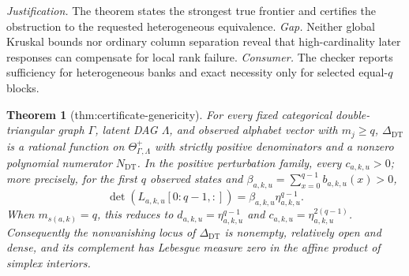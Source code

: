 \documentclass{article}
\newtheorem{theorem}{Theorem}
\begin{document}
\par\smallskip\noindent \textit{Justification.} The theorem states the strongest true frontier and certifies the obstruction to the requested heterogeneous equivalence. \textit{Gap.} Neither global Kruskal bounds nor ordinary column separation reveal that high-cardinality later responses can compensate for local rank failure. \textit{Consumer.} The checker reports sufficiency for heterogeneous banks and exact necessity only for selected equal-\(q\) blocks.

\begin{theorem}[thm:certificate-genericity]\label{thm:certificate-genericity}
For every fixed categorical double-triangular graph \(\Gamma\), latent DAG \(\Lambda\), and observed alphabet vector with \(m_j\ge q\), \(\Delta_{\mathrm{DT}}\) is a rational function on \(\Theta_{\Gamma,\Lambda}^{+}\) with strictly positive denominators and a nonzero polynomial numerator \(N_{\mathrm{DT}}\).  In the positive perturbation family, every \(c_{a,k,u}>0\); more precisely, for the first \(q\) observed states and \(\beta_{a,k,u}=\sum_{x=0}^{q-1}b_{a,k,u}(x)>0\),
\[
 \det(L_{a,k,u}[0{:}q-1,:])
 =\beta_{a,k,u}\eta_{a,k,u}^{q-1}.
\]
When \(m_{s(a,k)}=q\), this reduces to \(d_{a,k,u}=\eta_{a,k,u}^{q-1}\) and \(c_{a,k,u}=\eta_{a,k,u}^{2(q-1)}\).  Consequently the nonvanishing locus of \(\Delta_{\mathrm{DT}}\) is nonempty, relatively open and dense, and its complement has Lebesgue measure zero in the affine product of simplex interiors.
\end{theorem}
\end{document}
